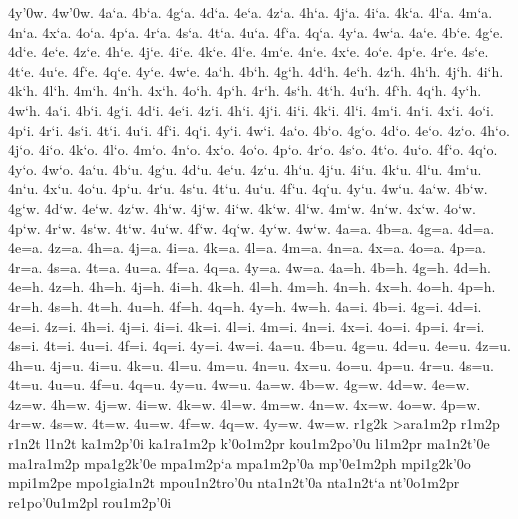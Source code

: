 {4y'0w.
4w'0w.
4a`a.
4b`a.
4g`a.
4d`a.
4e`a.
4z`a.
4h`a.
4j`a.
4i`a.
4k`a.
4l`a.
4m`a.
4n`a.
4x`a.
4o`a.
4p`a.
4r`a.
4s`a.
4t`a.
4u`a.
4f`a.
4q`a.
4y`a.
4w`a.
4a`e.
4b`e.
4g`e.
4d`e.
4e`e.
4z`e.
4h`e.
4j`e.
4i`e.
4k`e.
4l`e.
4m`e.
4n`e.
4x`e.
4o`e.
4p`e.
4r`e.
4s`e.
4t`e.
4u`e.
4f`e.
4q`e.
4y`e.
4w`e.
4a`h.
4b`h.
4g`h.
4d`h.
4e`h.
4z`h.
4h`h.
4j`h.
4i`h.
4k`h.
4l`h.
4m`h.
4n`h.
4x`h.
4o`h.
4p`h.
4r`h.
4s`h.
4t`h.
4u`h.
4f`h.
4q`h.
4y`h.
4w`h.
4a`i.
4b`i.
4g`i.
4d`i.
4e`i.
4z`i.
4h`i.
4j`i.
4i`i.
4k`i.
4l`i.
4m`i.
4n`i.
4x`i.
4o`i.
4p`i.
4r`i.
4s`i.
4t`i.
4u`i.
4f`i.
4q`i.
4y`i.
4w`i.
4a`o.
4b`o.
4g`o.
4d`o.
4e`o.
4z`o.
4h`o.
4j`o.
4i`o.
4k`o.
4l`o.
4m`o.
4n`o.
4x`o.
4o`o.
4p`o.
4r`o.
4s`o.
4t`o.
4u`o.
4f`o.
4q`o.
4y`o.
4w`o.
4a`u.
4b`u.
4g`u.
4d`u.
4e`u.
4z`u.
4h`u.
4j`u.
4i`u.
4k`u.
4l`u.
4m`u.
4n`u.
4x`u.
4o`u.
4p`u.
4r`u.
4s`u.
4t`u.
4u`u.
4f`u.
4q`u.
4y`u.
4w`u.
4a`w.
4b`w.
4g`w.
4d`w.
4e`w.
4z`w.
4h`w.
4j`w.
4i`w.
4k`w.
4l`w.
4m`w.
4n`w.
4x`w.
4o`w.
4p`w.
4r`w.
4s`w.
4t`w.
4u`w.
4f`w.
4q`w.
4y`w.
4w`w.
4a=a.
4b=a.
4g=a.
4d=a.
4e=a.
4z=a.
4h=a.
4j=a.
4i=a.
4k=a.
4l=a.
4m=a.
4n=a.
4x=a.
4o=a.
4p=a.
4r=a.
4s=a.
4t=a.
4u=a.
4f=a.
4q=a.
4y=a.
4w=a.
4a=h.
4b=h.
4g=h.
4d=h.
4e=h.
4z=h.
4h=h.
4j=h.
4i=h.
4k=h.
4l=h.
4m=h.
4n=h.
4x=h.
4o=h.
4p=h.
4r=h.
4s=h.
4t=h.
4u=h.
4f=h.
4q=h.
4y=h.
4w=h.
4a=i.
4b=i.
4g=i.
4d=i.
4e=i.
4z=i.
4h=i.
4j=i.
4i=i.
4k=i.
4l=i.
4m=i.
4n=i.
4x=i.
4o=i.
4p=i.
4r=i.
4s=i.
4t=i.
4u=i.
4f=i.
4q=i.
4y=i.
4w=i.
4a=u.
4b=u.
4g=u.
4d=u.
4e=u.
4z=u.
4h=u.
4j=u.
4i=u.
4k=u.
4l=u.
4m=u.
4n=u.
4x=u.
4o=u.
4p=u.
4r=u.
4s=u.
4t=u.
4u=u.
4f=u.
4q=u.
4y=u.
4w=u.
4a=w.
4b=w.
4g=w.
4d=w.
4e=w.
4z=w.
4h=w.
4j=w.
4i=w.
4k=w.
4l=w.
4m=w.
4n=w.
4x=w.
4o=w.
4p=w.
4r=w.
4s=w.
4t=w.
4u=w.
4f=w.
4q=w.
4y=w.
4w=w.
r1g2k
>ara1m2p
r1m2p
r1n2t
l1n2t
ka1m2p'0i
ka1ra1m2p
k'0o1m2pr
kou1m2po'0u
li1m2pr
ma1n2t'0e
ma1ra1m2p
mpa1g2k'0e
mpa1m2p`a
mpa1m2p'0a
mp'0e1m2ph
mpi1g2k'0o
mpi1m2pe
mpo1gia1n2t
mpou1n2tro'0u
nta1n2t'0a
nta1n2t`a
nt'0o1m2pr
re1po'0u1m2pl
rou1m2p'0i
}
\endinput
